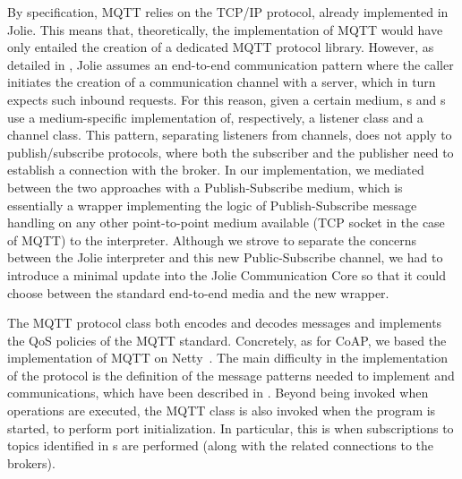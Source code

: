 By specification, MQTT relies on the TCP/IP protocol, already implemented in
Jolie. This means that, theoretically, the implementation of MQTT would have
only entailed the creation of a dedicated MQTT protocol library. However, as
detailed in , Jolie assumes an end-to-end
communication pattern where the caller initiates the creation of a
communication channel with a server, which in turn expects such inbound
requests. For this reason, given a certain medium, s and
s use a medium-specific implementation of, respectively, a
listener class and a channel class.
%
This pattern, separating listeners from channels, does not apply to
publish/subscribe protocols, where both the subscriber and the publisher need
to establish a connection with the broker. In our implementation, we mediated
between the two approaches with a Publish-Subscribe medium, which is
essentially a wrapper implementing the logic of Publish-Subscribe message
handling on any other point-to-point medium available (TCP socket in the case
of MQTT) to the interpreter. Although we strove to separate the concerns
between the Jolie interpreter and this new Public-Subscribe channel, we had to
introduce a minimal update into the Jolie \textsf{Communication Core} so that it could
choose between the standard end-to-end media and the new wrapper.

The MQTT protocol class both encodes and decodes messages and implements the QoS
policies of the MQTT standard. Concretely, as for CoAP, we based the
implementation of MQTT on Netty~\cite{maurer16}. The main difficulty in the
implementation of the protocol is the definition of the message patterns needed
to implement  and  communications, which have
been described in . Beyond being invoked when operations are executed, the
MQTT class is also invoked when the program is started, to perform port
initialization. In particular, this is when subscriptions to topics identified
in s are performed (along with the related connections to the
brokers).
